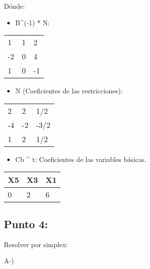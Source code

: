 \documentclass[11pt]{article}
\providecommand{\tightlist}{%
      \setlength{\itemsep}{0pt}\setlength{\parskip}{0pt}}
\begin{document}
Dónde:

\begin{itemize}
\tightlist
\item
  B\^{}(-1) * N:
\end{itemize}

\begin{longtable}[]{@{}lll@{}}
\toprule
1 & 1 & 2\tabularnewline
-2 & 0 & 4\tabularnewline
1 & 0 & -1\tabularnewline
\bottomrule
\end{longtable}

\begin{itemize}
\tightlist
\item
  N (Coeficientes de las restricciones):
\end{itemize}

\begin{longtable}[]{@{}lll@{}}
\toprule
2 & 2 & 1/2\tabularnewline
-4 & -2 & -3/2\tabularnewline
1 & 2 & 1/2\tabularnewline
\bottomrule
\end{longtable}

\begin{itemize}
\tightlist
\item
  Cb \^{} t: Coeficientes de las variables básicas.
\end{itemize}

\begin{longtable}[]{@{}lll@{}}
\toprule
X5 & X3 & X1\tabularnewline
\midrule
\endhead
0 & 2 & 6\tabularnewline
\bottomrule
\end{longtable}

    \subsection{Punto 4:}\label{punto-4}

Resolver por simplex:

A-)
\end{document}
